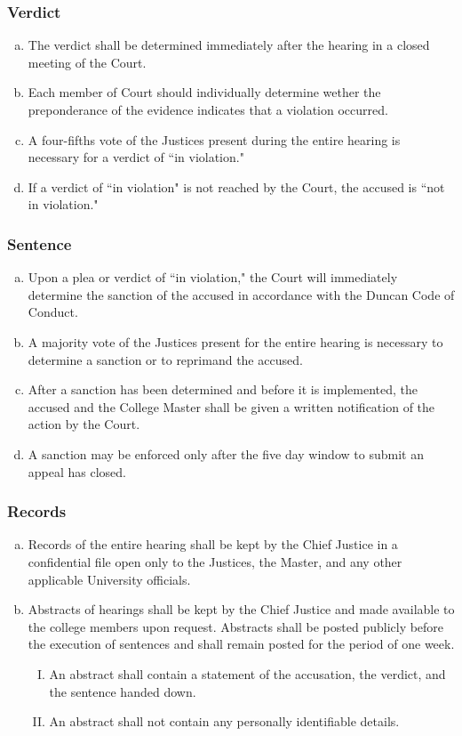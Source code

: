 \documentclass[USletter,12pt]{article}
\begin{document}
\subsubsection{Verdict}
\begin{enumerate}[(a)]
\item The verdict shall be determined immediately after the hearing in a closed meeting of the Court.
\item Each member of Court should individually determine wether the preponderance of the evidence indicates that a violation occurred.
\item A four-fifths vote of the Justices present during the entire hearing is necessary for a verdict of ``in violation."
\item If a verdict of ``in violation" is not reached by the Court, the accused is ``not in violation."
\end{enumerate}

\subsubsection{Sentence}
\begin{enumerate}[(a)]
\item Upon a plea or verdict of ``in violation," the Court will immediately determine the sanction of the accused in accordance with the Duncan Code of Conduct.
\item A majority vote of the Justices present for the entire hearing is necessary to determine a sanction or to reprimand the accused.
\item After a sanction has been determined and before it is implemented, the accused and the College Master shall be given a written notification of the action by the Court.
\item A sanction may be enforced only after the five day window to submit an appeal has closed.
\end{enumerate}

\subsubsection{Records}
\begin{enumerate}[(a)]
\item Records of the entire hearing shall be kept by the Chief Justice in a confidential file open only to the Justices, the Master, and any other applicable University officials.
\item Abstracts of hearings shall be kept by the Chief Justice and made available to the college members upon request.  Abstracts shall be posted publicly before the execution of sentences and shall remain posted for the period of one week.
	\begin{enumerate}[(I)]
	\item An abstract shall contain a statement of the accusation, the verdict, and the sentence handed down.
	\item An abstract shall not contain any personally identifiable details.
	\end{enumerate}
\end{enumerate}
\end{document}

